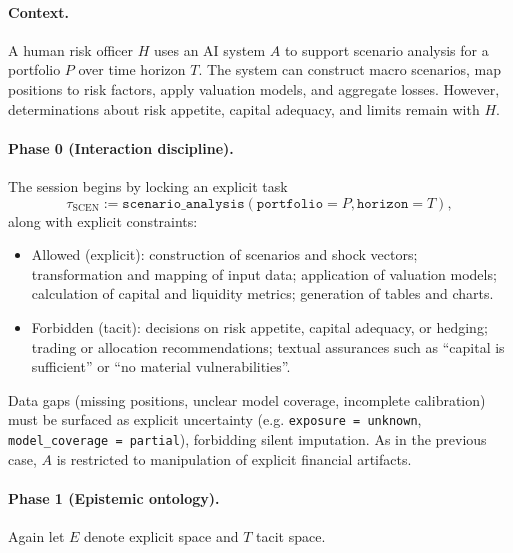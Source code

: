 \paragraph{Context.}
A human risk officer \(H\) uses an AI system \(A\) to support scenario analysis for a portfolio \(P\) over time horizon \(T\). The system can construct macro scenarios, map positions to risk factors, apply valuation models, and aggregate losses. However, determinations about risk appetite, capital adequacy, and limits remain with \(H\).

\paragraph{Phase 0 (Interaction discipline).}
The session begins by locking an explicit task
\[
  \tau_{\mathrm{SCEN}} := \texttt{scenario\_analysis}(\texttt{portfolio} = P, \texttt{horizon} = T),
\]
along with explicit constraints:
\begin{itemize}
  \item Allowed (explicit): construction of scenarios and shock vectors; transformation and mapping of input data; application of valuation models; calculation of capital and liquidity metrics; generation of tables and charts.
  \item Forbidden (tacit): decisions on risk appetite, capital adequacy, or hedging; trading or allocation recommendations; textual assurances such as ``capital is sufficient'' or ``no material vulnerabilities''.
\end{itemize}
Data gaps (missing positions, unclear model coverage, incomplete calibration) must be surfaced as explicit uncertainty (e.g. \verb|exposure = unknown|, \verb|model_coverage = partial|), forbidding silent imputation. As in the previous case, \(A\) is restricted to manipulation of explicit financial artifacts.

\paragraph{Phase 1 (Epistemic ontology).}
Again let \(E\) denote explicit space and \(T\) tacit space.

